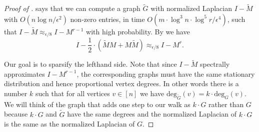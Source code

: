\documentclass{toc}
\newcommand{\wt}{\widetilde}   %
\numberwithin{myalgctr}{section}
\theoremstyle{named}
\begin{document}
\begin{proof}[Proof of ]
 says that we can compute a graph $\wt{G}$ with normalized Laplacian $I-\wt{M}$ with $O(n\log n/\epsilon^2)$ non-zero entries, in time $O(m\cdot \log^3 n\cdot \log^5 r/\epsilon^4)$, such that $I-\wt{M}\approx_{\epsilon/8}I-M^{r-1}$ with high probability. By  we have
\begin{equation}
\label{eq:oddtime}
I-\frac{1}{2}\cdot(\wt{M}M+M\wt{M}) \approx_{\epsilon/8} I-M^{r}.
\end{equation}

Our goal is to sparsify the lefthand side. Note that since $I-\wt{M}$ spectrally approximates $I-M^{r-1}$, the corresponding graphs must have the same stationary distribution and hence proportional vertex degrees. In other words there is a number $k$ such that for all vertices $v\in[n]$ we have $\mathrm{deg}_{\wt{G}}(v)=k\cdot\mathrm{deg}_{G}(v)$. We will think of the graph that adds one step to our walk as $k\cdot G$ rather than $G$ because $k\cdot G$ and $\wt{G}$ have the same degrees and the normalized Laplacian of $k\cdot G$ is the same as the normalized Laplacian of $G$.


\end{proof}
\end{document}
